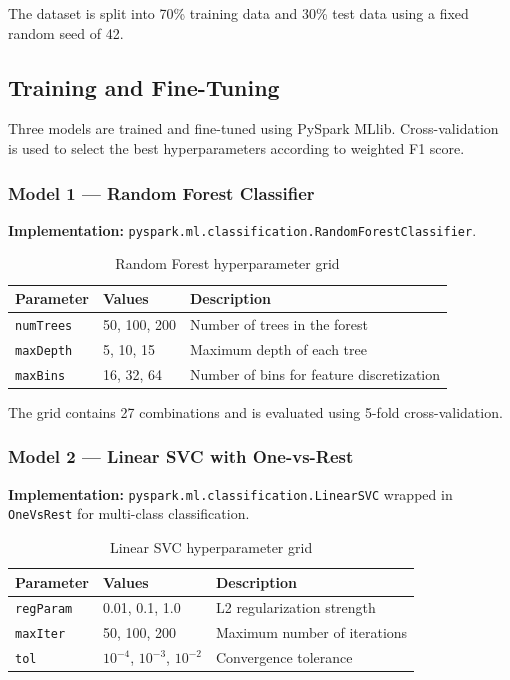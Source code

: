 \documentclass[12pt,a4paper]{article}
\begin{document}
The dataset is split into 70\% training data and 30\% test data using a fixed random seed of 42.

\subsection{Training and Fine-Tuning}

Three models are trained and fine-tuned using PySpark MLlib. Cross-validation is used to select the best hyperparameters according to weighted F1 score.

\subsubsection{Model 1 --- Random Forest Classifier}

\textbf{Implementation:} \texttt{pyspark.ml.classification.RandomForestClassifier}.

\begin{table}[H]
\centering
\caption{Random Forest hyperparameter grid}
\begin{tabular}{L{4cm} L{4cm} L{7cm}}
\toprule
\textbf{Parameter} & \textbf{Values} & \textbf{Description} \\
\midrule
\texttt{numTrees} & 50, 100, 200 & Number of trees in the forest \\
\texttt{maxDepth} & 5, 10, 15 & Maximum depth of each tree \\
\texttt{maxBins} & 16, 32, 64 & Number of bins for feature discretization \\
\bottomrule
\end{tabular}
\end{table}

The grid contains 27 combinations and is evaluated using 5-fold cross-validation.

\subsubsection{Model 2 --- Linear SVC with One-vs-Rest}

\textbf{Implementation:} \texttt{pyspark.ml.classification.LinearSVC} wrapped in \texttt{OneVsRest} for multi-class classification.

\begin{table}[H]
\centering
\caption{Linear SVC hyperparameter grid}
\begin{tabular}{L{4cm} L{4cm} L{7cm}}
\toprule
\textbf{Parameter} & \textbf{Values} & \textbf{Description} \\
\midrule
\texttt{regParam} & 0.01, 0.1, 1.0 & L2 regularization strength \\
\texttt{maxIter} & 50, 100, 200 & Maximum number of iterations \\
\texttt{tol} & $10^{-4}$, $10^{-3}$, $10^{-2}$ & Convergence tolerance \\
\bottomrule
\end{tabular}
\end{table}
\end{document}

